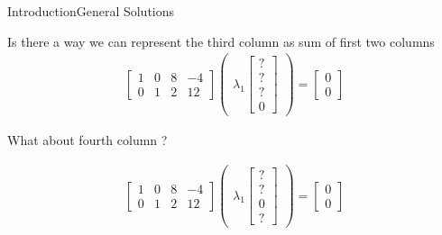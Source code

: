 \documentclass[10pt]{beamer}
\begin{document}

\begin{frame}{Introduction}{General Solutions}

Is there a way we can represent the third column as sum of first two columns
\begin{align}
\begin{bmatrix} 1 & 0 & 8 & -4 \\ 0 & 1 & 2 & 12 \end{bmatrix} \begin{pmatrix} \lambda_{1}\begin{bmatrix}?\\?\\?\\0\end{bmatrix} \end{pmatrix}= \begin{bmatrix}0\\0\end{bmatrix}
\end{align}

What about fourth column ?

\pause 

\begin{align}
\begin{bmatrix} 1 & 0 & 8 & -4 \\ 0 & 1 & 2 & 12 \end{bmatrix} \begin{pmatrix} \lambda_{1}\begin{bmatrix}?\\?\\0\\?\end{bmatrix} \end{pmatrix}= \begin{bmatrix}0\\0\end{bmatrix}
\end{align}

\end{frame}


\end{document}
